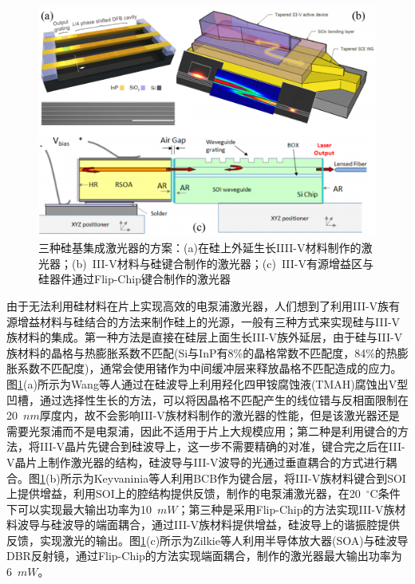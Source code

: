 \begin{figure}[htb]
	\centering
	\includegraphics[width=14cm]{./Pictures/intro_lasers.jpg}
	\captionsetup{justification=centering}
	\caption{三种硅基集成激光器的方案：(a)在硅上外延生长IIII-V材料制作的激光器\cite{wang2015room}；(b)~III-V材料与硅键合制作的激光器\cite{keyvaninia2013demonstration}；(c)~III-V有源增益区与硅器件通过Flip-Chip键合制作的激光器\cite{zilkie2012power}}
	\label{intro_lasers}
\end{figure}

由于无法利用硅材料在片上实现高效的电泵浦激光器，人们想到了利用III-V族有源增益材料与硅结合的方法来制作硅上的光源\cite{heck2013hybrid,keyvaninia2013heterogeneously}，一般有三种方式来实现硅与III-V族材料的集成\cite{bowers2014path}。第一种方法是直接在硅层上面生长III-V族外延层，由于硅与III-V族材料的晶格与热膨胀系数不匹配(Si与InP有8\%的晶格常数不匹配度，84\%的热膨胀系数不匹配度)，通常会使用锗作为中间缓冲层来释放晶格不匹配造成的应力。图\ref{intro_lasers}(a)所示为Wang等人通过在硅波导上利用羟化四甲铵腐蚀液(TMAH)腐蚀出V型凹槽，通过选择性生长的方法，可以将因晶格不匹配产生的线位错与反相面限制在20~$nm$厚度内，故不会影响III-V族材料制作的激光器的性能\cite{wang2015room}，但是该激光器还是需要光泵浦而不是电泵浦，因此不适用于片上大规模应用；第二种是利用键合的方法，将III-V晶片先键合到硅波导上，这一步不需要精确的对准，键合完之后在III-V晶片上制作激光器的结构，硅波导与III-V波导的光通过垂直耦合的方式进行耦合。图\ref{intro_lasers}(b)所示为Keyvaninia等人利用BCB作为键合层，将III-V族材料键合到SOI上提供增益，利用SOI上的腔结构提供反馈，制作的电泵浦激光器，在20~$^{\circ}$C条件下可以实现最大输出功率为10~$mW$\cite{keyvaninia2013demonstration}；第三种是采用Flip-Chip的方法实现III-V族材料波导与硅波导的端面耦合，通过III-V族材料提供增益，硅波导上的谐振腔提供反馈，实现激光的输出。图\ref{intro_lasers}(c)所示为Zilkie等人利用半导体放大器(SOA)与硅波导DBR反射镜，通过Flip-Chip的方法实现端面耦合，制作的激光器最大输出功率为6~$mW$\cite{zilkie2012power}。


